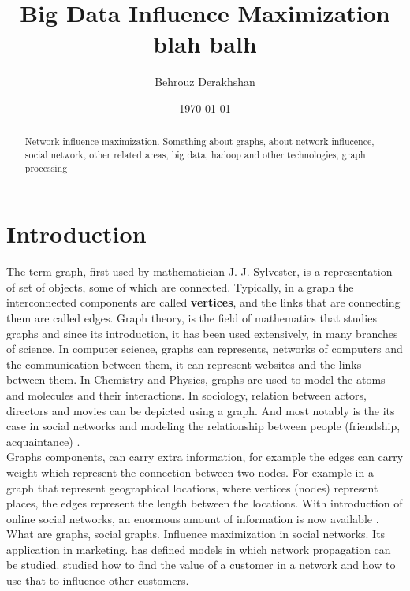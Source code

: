 \documentclass[english]{tktltiki}
\begin{document}
\onehalfspacing

\title{Big Data Influence Maximization blah balh}
\author{Behrouz Derakhshan}
\date{\today}

\maketitle



\begin{abstract}

Network influence maximization. Something about graphs, about network influcence, social network, other related areas, big data, hadoop and other technologies, graph processing

\end{abstract}

\mytableofcontents




\section{Introduction}
The term graph, first used by mathematician J. J. Sylvester, is a representation of set of objects, some of which are connected. Typically, in a graph the interconnected components are called \textbf{vertices}, and the links that are connecting them are called edges. Graph theory, is the field of mathematics that studies graphs and since its introduction, it has been used extensively, in many branches of science. In computer science, graphs can represents, networks of computers and the communication between them, it can represent websites and the links between them. In Chemistry and Physics, graphs are used to model the atoms and molecules and their interactions. In sociology, relation between actors, directors and movies can be depicted using a graph. And most notably is the its case in social networks and modeling the relationship between people (friendship, acquaintance) . \\
Graphs components, can carry extra information, for example the edges can carry weight which represent the connection between two nodes. For example in a graph that represent geographical locations, where vertices (nodes) represent places, the edges represent the length between the locations. 
With introduction of online social networks, an enormous amount of information is now available .
What are graphs, social graphs. Influence maximization in social networks. Its application in marketing.  \cite{kempe03} has defined models in which network propagation can be studied. 
\cite{domingo01} studied how to find the value of a customer in a network and how to use that to influence other customers.
\end{document}
